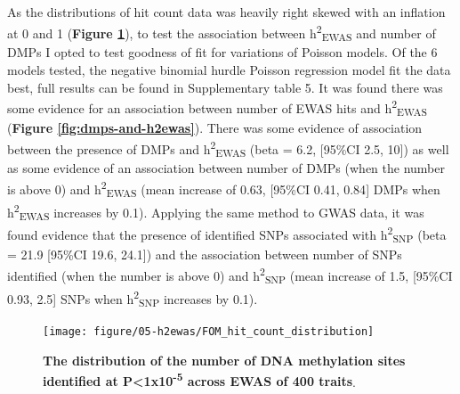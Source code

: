 \documentclass[11pt,oneside]{bristolthesis}
\begin{document}
As the distributions of hit count data was heavily right skewed with an inflation at 0 and 1 (\textbf{Figure \ref{fig:h2ewas-dmp-dist}}), to test the association between h\textsuperscript{2}\textsubscript{EWAS} and number of DMPs I opted to test goodness of fit for variations of Poisson models. Of the 6 models tested, the negative binomial hurdle Poisson regression model fit the data best, full results can be found in Supplementary table 5. It was found there was some evidence for an association between number of EWAS hits and h\textsuperscript{2}\textsubscript{EWAS} (\textbf{Figure \ref{fig:dmps-and-h2ewas}}). There was some evidence of association between the presence of DMPs and h\textsuperscript{2}\textsubscript{EWAS} (beta = 6.2, {[}95\%CI 2.5, 10{]}) as well as some evidence of an association between number of DMPs (when the number is above 0) and h\textsuperscript{2}\textsubscript{EWAS} (mean increase of 0.63, {[}95\%CI 0.41, 0.84{]} DMPs when h\textsuperscript{2}\textsubscript{EWAS} increases by 0.1). Applying the same method to GWAS data, it was found evidence that the presence of identified SNPs associated with h\textsuperscript{2}\textsubscript{SNP} (beta = 21.9 {[}95\%CI 19.6, 24.1{]}) and the association between number of SNPs identified (when the number is above 0) and h\textsuperscript{2}\textsubscript{SNP} (mean increase of 1.5, {[}95\%CI 0.93, 2.5{]} SNPs when h\textsuperscript{2}\textsubscript{SNP} increases by 0.1).




\begin{figure}

{\centering \texttt{[image: figure/05-h2ewas/FOM\_hit\_count\_distribution]} 

}

\caption[The distribution of the number of DNA methylation sites identified at P\textless1x10\textsuperscript{-5} across EWAS of 400 traits]{\textbf{The distribution of the number of DNA methylation sites identified at P\textless1x10\textsuperscript{-5} across EWAS of 400 traits}.}\label{fig:h2ewas-dmp-dist}
\end{figure}
\end{document}
